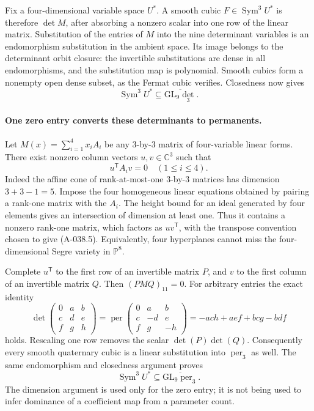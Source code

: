 Fix a four-dimensional variable space \(U^*\). A smooth
cubic \(F\in\operatorname{Sym}^3U^*\) is therefore
\(\det M\), after absorbing a nonzero scalar into one row
of the linear matrix. Substitution of the entries of \(M\)
into the nine determinant variables is an endomorphism
substitution in the ambient space. Its image belongs to
the determinant orbit closure: the invertible substitutions
are dense in all endomorphisms, and the substitution map
is polynomial. Smooth cubics form a nonempty open dense
subset, as the Fermat cubic verifies. Closedness now gives
\[
          \operatorname{Sym}^3U^*
                    \subseteq\overline{\mathrm{GL}_9\det_3}.
                                                               \tag{A-038.4}
\]

\paragraph{One zero entry converts these determinants to permanents.}
Let \(M(x)=\sum_{i=1}^4x_iA_i\) be any \(3\)-by-\(3\)
matrix of four-variable linear forms. There exist nonzero
column vectors \(u,v\in\mathbb C^3\) such that
\[
                         u^{\mathsf T}A_i v=0
                                      \quad(1\leq i\leq4).
                                                               \tag{A-038.5}
\]
Indeed the affine cone of rank-at-most-one \(3\)-by-\(3\)
matrices has dimension \(3+3-1=5\). Impose the four
homogeneous linear equations obtained by pairing a
rank-one matrix with the \(A_i\). The height bound for an
ideal generated by four elements gives an intersection of
dimension at least one. Thus it contains a nonzero rank-one
matrix, which factors as \(uv^{\mathsf T}\), with the
transpose convention chosen to give (A-038.5).
Equivalently, four hyperplanes cannot miss the
four-dimensional Segre variety in \(\mathbb P^8\).

Complete \(u^{\mathsf T}\) to the first row of an invertible
matrix \(P\), and \(v\) to the first column of an invertible
matrix \(Q\). Then \((PMQ)_{11}=0\). For arbitrary entries
the exact identity
\[
 \det\begin{pmatrix}0&a&b\\c&d&e\\f&g&h\end{pmatrix}
     =
 \operatorname{per}
       \begin{pmatrix}0&a&b\\c&-d&e\\f&g&-h\end{pmatrix}
     =-ach+aef+bcg-bdf                                      \tag{A-038.6}
\]
holds. Rescaling one row removes the scalar
\(\det(P)\det(Q)\).
Consequently every smooth quaternary cubic is a linear
substitution into \(\operatorname{per}_3\) as well.
The same endomorphism and closedness argument proves
\[
          \operatorname{Sym}^3U^*
                    \subseteq\overline{\mathrm{GL}_9\operatorname{per}_3}.
                                                               \tag{A-038.7}
\]
The dimension argument is used only for the zero entry;
it is not being used to infer dominance of a coefficient
map from a parameter count.

